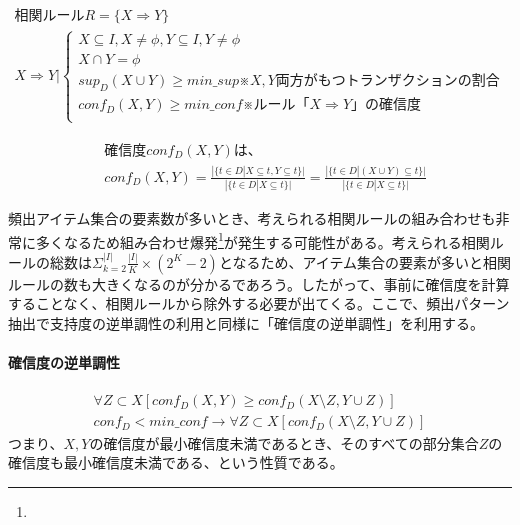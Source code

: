 \documentclass[dvipdfmx]{jsarticle}
\begin{document}
\begin{gather*}
  相関ルールR = \{ X \Rightarrow Y \} \\
  X \Rightarrow Y |
  \begin{cases}
    {X \subseteq I, X \neq \phi , Y \subseteq I, Y \neq \phi} \\
    {X \cap Y = \phi} \\
    {sup_{D}(X\cup Y) \geq min\_sup}　※X,Y両方がもつトランザクションの割合\\
    {conf_{D}(X, Y) \geq min\_conf}　※ルール「X \Rightarrow Y」の確信度\\
  \end{cases}
\end{gather*}
\begin{fleqn}
  \begin{align*}
    &確信度conf_{D}(X, Y)は、\\
    &conf_{D}(X, Y) = \frac{|\{t\in D |X \subseteq t, Y \subseteq t\}|}{|\{ t\in D | X \subseteq t\}|}
    = \frac{|\{ t \in D | (X\cup Y) \subseteq t\}|}{|\{ t \in D | X \subseteq t\}|}
  \end{align*}
\end{fleqn}
頻出アイテム集合の要素数が多いとき、考えられる相関ルールの組み合わせも非常に多くなるため組み合わせ爆発\footnote{}が発生する可能性がある。考えられる相関ルールの総数は$\Sigma_{k=2}^{|I|}\frac{|I|}{K}\times (2^{K}-2)$となるため、アイテム集合の要素が多いと相関ルールの数も大きくなるのが分かるであろう。したがって、事前に確信度を計算することなく、相関ルールから除外する必要が出てくる。ここで、頻出パターン抽出で支持度の逆単調性の利用と同様に「確信度の逆単調性」を利用する。
\paragraph{確信度の逆単調性}
\begin{gather*}
  \forall Z \subset X[ conf_{D}(X, Y) \geq conf_{D}(X \setminus Z, Y \cup Z)] \\
  conf_{D} < min\_conf \rightarrow \forall Z \subset X[conf_{D}(X \setminus Z, Y \cup Z)]
\end{gather*}
つまり、$X, Y$の確信度が最小確信度未満であるとき、そのすべての部分集合$Z$の確信度も最小確信度未満である、という性質である。\par
\end{document}
